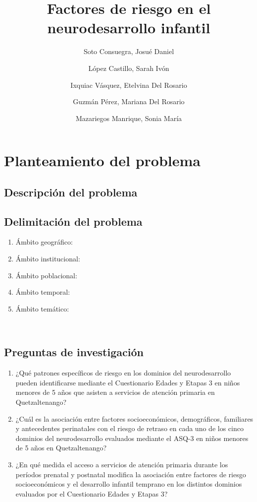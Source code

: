 \documentclass[11pt,letterpaper]{report}
\title{Factores de riesgo en el neurodesarrollo infantil}
\author{Soto Consuegra, Josué Daniel \and López Castillo, Sarah Ivón \and
Ixquiac Vásquez, Etelvina Del Rosario \and Guzmán Pérez, Mariana Del Rosario
\and Mazariegos Manrique, Sonia María}
\begin{document}
	\tableofcontents
	\chapter{Planteamiento del problema}
\section{Descripción del problema}
\section{Delimitación del problema}
	\begin{enumerate}
		\item Ámbito geográfico:
		\item Ámbito institucional:
		\item Ámbito poblacional:
		\item Ámbito temporal:
		\item Ámbito temático:
	\end{enumerate}\
\section{Preguntas de investigación}
	\begin{enumerate}
		\item ¿Qué patrones específicos de riesgo en los dominios del
			neurodesarrollo pueden identificarse mediante el Cuestionario
			Edades y Etapas 3 en niños menores de 5 años que asisten a
			servicios de atención primaria en Quetzaltenango?
		\item ¿Cuál es la asociación entre factores socioeconómicos,
			demográficos, familiares y antecedentes perinatales con el riesgo
			de retraso en cada uno de los cinco dominios del neurodesarrollo
			evaluados mediante el ASQ-3 en niños menores de 5 años en
			Quetzaltenango?
		\item ¿En qué medida el acceso a servicios de atención primaria durante
			los períodos prenatal y postnatal modifica la asociación entre
			factores de riesgo socioeconómicos y el desarrollo infantil
			temprano en los distintos dominios evaluados por el Cuestionario
			Edades y Etapas 3?
	\end{enumerate}
\end{document}
